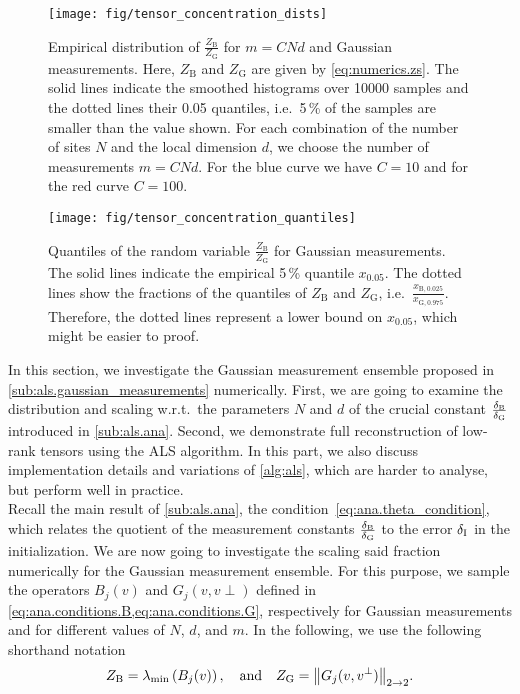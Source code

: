 \begin{figure*}
  \texttt{[image: fig/tensor\_concentration\_dists]}
  \caption{%
    \label{fig:numerics.dists}%
    Empirical distribution of $\frac{Z_\mathrm{B}}{Z_\mathrm{G}}$ for $m = C N d$ and Gaussian measurements.
    Here, $Z_\mathrm{B}$ and $Z_\mathrm{G}$ are given by \cref{eq:numerics.zs}.
    The solid lines indicate the smoothed histograms over 10000 samples and the dotted lines their 0.05 quantiles, i.e.\ 5\,\% of the samples are smaller than the value shown.
    For each combination of the number of sites $N$ and the local dimension $d$, we choose the number of measurements $m = CNd$.
    For the blue curve we have $C = 10$ and for the red curve $C=100$.
  }
\end{figure*}
\begin{figure*}
  \texttt{[image: fig/tensor\_concentration\_quantiles]}
  \caption{%
    \label{fig:numerics.quantiles}%
    Quantiles of the random variable $\frac{Z_\mathrm{B}}{Z_\mathrm{G}}$ for Gaussian measurements.
    The solid lines indicate the empirical 5\,\% quantile $x_{0.05}$.
    The dotted lines show the fractions of the  quantiles of $Z_\mathrm{B}$ and $Z_\mathrm{G}$, i.e.\ $\frac{x_{\mathrm{B},0.025}}{x_{\mathrm{G},0.975}}$.
    Therefore, the dotted lines represent a lower bound on $x_{0.05}$, which might be easier to proof.
  }
\end{figure*}


In this section, we investigate the Gaussian measurement ensemble proposed in \cref{sub:als.gaussian_measurements} numerically.
First, we are going to examine the distribution and scaling w.r.t.\ the parameters $N$ and $d$ of the crucial constant $\frac{\delta_\mathrm{B}}{\delta_\mathrm{G}}$ introduced in \cref{sub:als.ana}.
Second, we demonstrate full reconstruction of low-rank tensors using the ALS algorithm.
In this part, we also discuss implementation details and variations of \cref{alg:als}, which are harder to analyse, but perform well in practice.\\


Recall the main result of \cref{sub:als.ana}, the condition~\eqref{eq:ana.theta_condition}, which relates the quotient of the measurement constants $\frac{\delta_\mathrm{B}}{\delta_\mathrm{G}}$ to the error $\delta_\mathrm{I}$ in the initialization.
We are now going to investigate the scaling said fraction numerically for the Gaussian measurement ensemble.
For this purpose, we sample the operators $B_j(v)$ and $G_j(v, v\perp)$ defined in \cref{eq:ana.conditions.B,eq:ana.conditions.G}, respectively for Gaussian measurements and for different values of $N$, $d$, and $m$.
In the following, we use the following shorthand notation
\[
  \label{eq:numerics.zs}
  Z_\mathrm{B} = \lambda_\mathrm{min}\left(B_j(v)\right),
  \quad\mbox{and}\quad
  Z_\mathrm{G} = {\left\Vert G_j(v,v^\perp)\right\Vert}_{2 \to 2}.
\]

